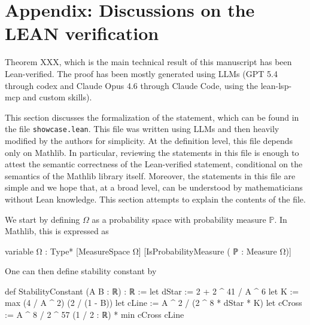 \documentclass[11pt]{amsart}
\numberwithin{equation}{section}
\theoremstyle{definition}
\theoremstyle{remark}
\begin{document}
\section{Appendix: Discussions on the LEAN verification}

Theorem XXX, which is the main technical result of this manuscript has been Lean-verified. The proof has been mostly generated using LLMs (GPT 5.4 through codex and Claude Opus 4.6 through Claude Code, using the lean-lsp-mcp and custom skills). 

This section discusses the formalization of the statement, which can be found in the file {\scriptsize \texttt{showcase.lean}}. This file was written using LLMs and then heavily modified by the authors for simplicity. At the definition level, this file depends only on Mathlib. In particular, reviewing the statements in this file is enough to attest the semantic correctness of the Lean-verified statement, conditional on the semantics of the Mathlib library itself. Moreover, the statements in this file are simple and we hope that, at a broad level, can be understood by mathematicians without Lean knowledge. This section attempts to explain the contents of the file.

We start by defining $\Omega$ as a probability space with probability measure $\mathbb P$. In Mathlib, this is expressed as
\begin{leancode}
variable { Ω : Type*} [MeasureSpace Ω] [IsProbabilityMeasure ( ℙ : Measure Ω)]
\end{leancode}

One can then define stability constant by
\begin{leancode}
def StabilityConstant (A B : ℝ) : ℝ :=
  let dStar := 2 + 2 ^ 41 / A ^ 6
  let K := max (4 / A ^ 2) (2 / (1 - B))
  let cLine := A ^ 2 / (2 ^ 8  * dStar * K)
  let cCross  := A ^ 8  / 2  ^ 57 
  (1 / 2 : ℝ) * min cCross cLine
\end{leancode}
\end{document}
